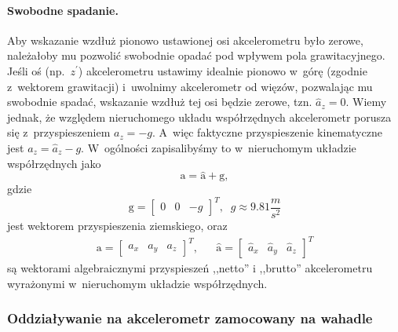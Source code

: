 \documentclass[paper=a4,DIV=12]{tmmlab}
\newcommand{\brm}[1]{\bm{\mathrm{#1}}}
\begin{document}
\begin{appendices}
\paragraph{Swobodne spadanie.}
Aby wskazanie wzdłuż pionowo ustawionej osi akcelerometru było zerowe,
należałoby mu pozwolić swobodnie opadać pod wpływem pola grawitacyjnego.
Jeśli oś (np.~$z^{\prime}$)  akcelerometru ustawimy idealnie pionowo w~górę
(zgodnie z~wektorem grawitacji) i~uwolnimy akcelerometr od więzów,
pozwalając mu swobodnie spadać, wskazanie wzdłuż tej osi będzie zerowe, tzn.
$\hat{a}_z =0$. Wiemy jednak, że względem nieruchomego układu współrzędnych
akcelerometr porusza się z~przyspieszeniem $a_z = -g$. A~więc faktyczne
przyspieszenie kinematyczne jest $a_z = \hat{a}_z - g$. W~ogólności
zapisalibyśmy to w~nieruchomym układzie współrzędnych jako
\begin{equation}
  \brm{a} = \hat{\brm{a}} + \brm{g},
  \label{eq:QDX8V}
\end{equation}
gdzie
\begin{equation}
  \brm{g} = \begin{bmatrix} 0 & 0 & -g \end{bmatrix}^T, \;\; g \approx 9.81 \frac{m}{s^2}
  \label{eq:PWKKB}
\end{equation}
jest wektorem przyspieszenia ziemskiego, oraz
\begin{align}
  & \brm{a} = \begin{bmatrix}
    a_x & a_y & a_z
  \end{bmatrix}^T, &
  & \hat{\brm{a}} = \begin{bmatrix}
    \hat{a}_x & \hat{a}_y & \hat{a}_z
  \end{bmatrix}^T &
  \label{eq:0JPXH}
\end{align}
są wektorami algebraicznymi przyspieszeń ,,netto'' i ,,brutto'' akcelerometru
wyrażonymi w~nieruchomym układzie współrzędnych.

\subsubsection{Oddziaływanie na akcelerometr zamocowany na wahadle}
\label{sec:JO17Z}


\end{appendices}
\end{document}
